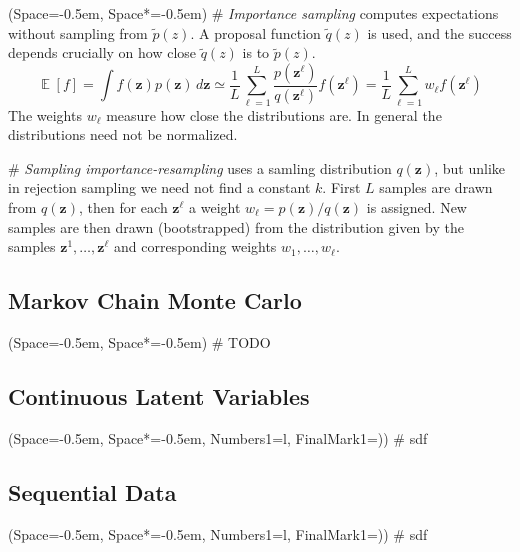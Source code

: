 \documentclass[12pt, a4paper]{article}
\newcommand{\listSpace}{-0.5em}%
\newcommand{\vect}[1]{\bm{#1}}
\DeclareMathOperator{\E}{\mathbb{E}}
\begin{document}
		\begin{easylist}[itemize]
			\ListProperties(Space=\listSpace, Space*=\listSpace)
	# \emph{Importance sampling} computes expectations without sampling from $\widetilde{p}(z)$.
	A proposal function $\widetilde{q}(z)$ is used, and the success depends crucially on how close $\widetilde{q}(z)$ is to $\widetilde{p}(z)$.
	\begin{equation*}
		\E [f] = \int f(\vect{z}) p(\vect{z}) \, d \vect{z}
		\simeq \frac{1}{L} \sum_{\ell = 1}^{L} \frac{p(\vect{z}^\ell)}{q(\vect{z}^\ell)} f(\vect{z}^\ell)
		= \frac{1}{L} \sum_{\ell = 1}^{L} w_\ell f(\vect{z}^\ell)
	\end{equation*}
	The weights $w_\ell$ measure how close the distributions are.
	In general the distributions need not be normalized.
	
	# \emph{Sampling importance-resampling} uses a samling distribution $q(\vect{z})$, but unlike in rejection sampling we need not find a constant $k$.
	First $L$ samples are drawn from $q(\vect{z})$, then for each $\vect{z}^\ell$ a weight $w_\ell = p(\vect{z})/q(\vect{z})$ is assigned.
	New samples are then drawn (bootstrapped) from the distribution given by the samples $\vect{z}^1, \ldots, \vect{z}^\ell$ and corresponding weights $w_1, \ldots, w_\ell$.
\end{easylist}

\subsection*{Markov Chain Monte Carlo}
\begin{easylist}[itemize]
	\ListProperties(Space=\listSpace, Space*=\listSpace)
	# TODO
\end{easylist}

\subsection{Continuous Latent Variables}
\begin{easylist}[itemize]
	\ListProperties(Space=\listSpace, Space*=\listSpace, Numbers1=l, FinalMark1={)})
	# sdf
\end{easylist}

\subsection{Sequential Data}
\begin{easylist}[itemize]
	\ListProperties(Space=\listSpace, Space*=\listSpace, Numbers1=l, FinalMark1={)})
	# sdf
\end{easylist}
\end{document}
